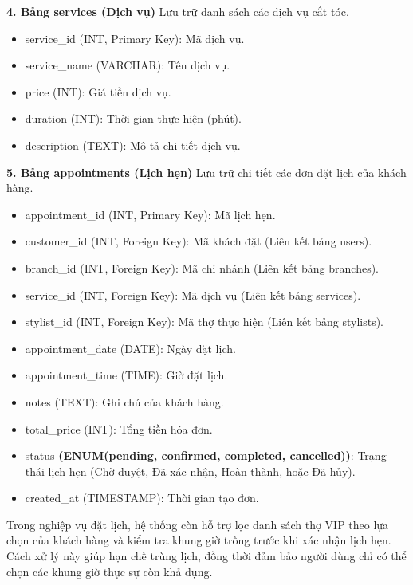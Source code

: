 \documentclass[../BTL.tex]{subfiles}
\begin{document}
\textbf{4. Bảng services (Dịch vụ)} Lưu trữ danh sách các dịch vụ cắt
tóc.

\begin{itemize}
\item
  service\_id (INT, Primary Key): Mã dịch vụ.
\item
  service\_name (VARCHAR): Tên dịch vụ.
\item
  price (INT): Giá tiền dịch vụ.
\item
  duration (INT): Thời gian thực hiện (phút).
\item
  description (TEXT): Mô tả chi tiết dịch vụ.
\end{itemize}

\textbf{5. Bảng appointments (Lịch hẹn)} Lưu trữ chi tiết các đơn đặt
lịch của khách hàng.

\begin{itemize}
\item
  appointment\_id (INT, Primary Key): Mã lịch hẹn.
\item
  customer\_id (INT, Foreign Key): Mã khách đặt (Liên kết bảng users).
\item
  branch\_id (INT, Foreign Key): Mã chi nhánh (Liên kết bảng branches).
\item
  service\_id (INT, Foreign Key): Mã dịch vụ (Liên kết bảng services).
\item
  stylist\_id (INT, Foreign Key): Mã thợ thực hiện (Liên kết bảng
  stylists).
\item
  appointment\_date (DATE): Ngày đặt lịch.
\item
  appointment\_time (TIME): Giờ đặt lịch.
\item
  notes (TEXT): Ghi chú của khách hàng.
\item
  total\_price (INT): Tổng tiền hóa đơn.
\item
  status \textbf{(ENUM(\textquotesingle pending\textquotesingle,
  \textquotesingle confirmed\textquotesingle,
  \textquotesingle completed\textquotesingle,
  \textquotesingle cancelled\textquotesingle))}: Trạng thái lịch hẹn
  (Chờ duyệt, Đã xác nhận, Hoàn thành, hoặc Đã hủy).
\item
  created\_at (TIMESTAMP): Thời gian tạo đơn.
\end{itemize}

Trong nghiệp vụ đặt lịch, hệ thống còn hỗ trợ lọc danh sách thợ VIP theo
lựa chọn của khách hàng và kiểm tra khung giờ trống trước khi xác nhận
lịch hẹn. Cách xử lý này giúp hạn chế trùng lịch, đồng thời đảm bảo
người dùng chỉ có thể chọn các khung giờ thực sự còn khả dụng.
\end{document}
